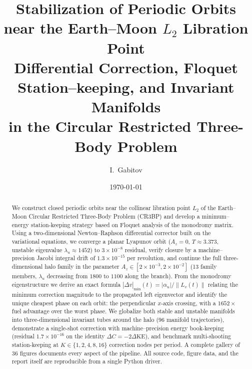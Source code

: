 \documentclass[11pt,a4paper]{article}
\title{\vspace{-1.5cm}
\textbf{Stabilization of Periodic Orbits near the Earth--Moon $L_2$ Libration Point} \\
\large Differential Correction, Floquet Station--keeping, and Invariant Manifolds \\
in the Circular Restricted Three-Body Problem}
\author{I.~Gabitov}
\date{\today}
\begin{document}
\maketitle
\thispagestyle{fancy}

\begin{center}
\end{center}
\vspace{0.4cm}

\begin{abstract}
We construct closed periodic orbits near the collinear libration point $L_2$ of the Earth--Moon Circular Restricted Three-Body Problem (CR3BP) and develop a minimum--energy station-keeping strategy based on Floquet analysis of the monodromy matrix. Using a two-dimensional Newton--Raphson differential corrector built on the variational equations, we converge a planar Lyapunov orbit ($A_z = 0$, $T \approx 3.373$, unstable eigenvalue $\lambda_u \approx 1452$) to $3\times 10^{-8}$ residual, verify closure by a machine--precision Jacobi integral drift of $1.3\times 10^{-15}$ per revolution, and continue the full three-dimensional halo family in the parameter $A_z \in [2\times 10^{-3}, 2\times 10^{-2}]$ (13 family members, $\lambda_u$ decreasing from $1800$ to $1100$ along the branch). From the monodromy eigenstructure we derive an exact formula $|\Delta v|_{\min}(t) = |\alpha_u|/\|L_v(t)\|$ relating the minimum correction magnitude to the propagated left eigenvector and identify the unique cheapest phase on each orbit: the perpendicular $x$-axis crossing, with a $1652\times$ fuel advantage over the worst phase. We globalize both stable and unstable manifolds into three-dimensional invariant tubes around the halo ($96$ manifold trajectories), demonstrate a single-shot correction with machine--precision energy book-keeping (residual $1.7\times 10^{-16}$ on the identity $\Delta C = -2\Delta\mathrm{KE}$), and benchmark multi-shooting station-keeping at $K \in \{1,2,4,8,16\}$ correction nodes per period. A complete gallery of 36 figures documents every aspect of the pipeline. All source code, figure data, and the report itself are reproducible from a single Python driver.
\end{abstract}
\end{document}
